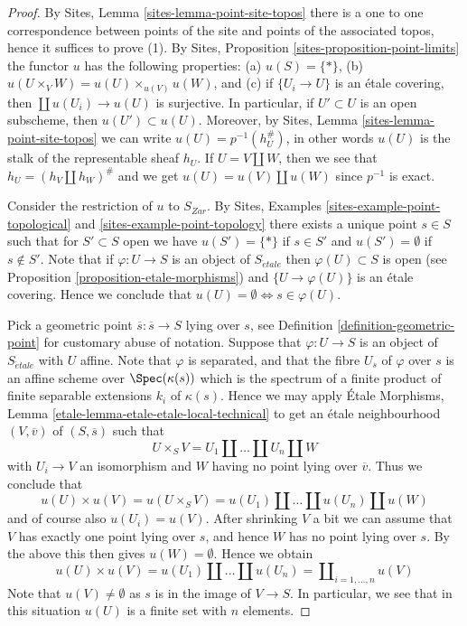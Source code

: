 \begin{proof}
By
Sites, Lemma \ref{sites-lemma-point-site-topos}
there is a one to one correspondence between points of the site and points
of the associated topos, hence it suffices to prove (1).
By
Sites, Proposition \ref{sites-proposition-point-limits}
the functor $u$ has the following properties:
(a) $u(S) = \{*\}$, (b) $u(U \times_V W) = u(U) \times_{u(V)} u(W)$, and
(c) if $\{U_i \to U\}$ is an \'etale covering, then
$\coprod u(U_i) \to u(U)$ is surjective.
In particular, if $U' \subset U$ is an open subscheme,
then $u(U') \subset u(U)$. Moreover, by
Sites, Lemma \ref{sites-lemma-point-site-topos}
we can write $u(U) = p^{-1}(h_U^\#)$, in other words $u(U)$ is the
stalk of the representable sheaf $h_U$. If
$U = V \amalg W$, then we see that $h_U = (h_V \amalg h_W)^\#$ and we get
$u(U) = u(V) \amalg u(W)$ since $p^{-1}$ is exact.

\medskip\noindent
Consider the restriction of $u$ to $S_{Zar}$. By
Sites, Examples \ref{sites-example-point-topological} and
\ref{sites-example-point-topology}
there exists a unique point $s \in S$ such that for $S' \subset S$ open we
have $u(S') = \{*\}$ if $s \in S'$ and $u(S') = \emptyset$ if $s \not \in S'$.
Note that if $\varphi : U \to S$ is an object of $S_{\acute{e}tale}$ then
$\varphi(U) \subset S$ is open (see
Proposition \ref{proposition-etale-morphisms})
and $\{U \to \varphi(U)\}$ is an \'etale covering. Hence we conclude that
$u(U) = \emptyset \Leftrightarrow s \in \varphi(U)$.

\medskip\noindent
Pick a geometric point $\overline{s} : \overline{s} \to S$ lying over $s$, see
Definition \ref{definition-geometric-point}
for customary abuse of notation. Suppose that $\varphi : U \to S$ is an object
of $S_{\acute{e}tale}$ with $U$ affine. Note that $\varphi$ is separated, and
that the fibre $U_s$ of $\varphi$ over $s$ is an affine scheme over
$\Spec(\kappa(s))$ which is the spectrum of a finite product of
finite separable extensions $k_i$ of $\kappa(s)$. Hence we may apply
\'Etale Morphisms, Lemma \ref{etale-lemma-etale-etale-local-technical}
to get an \'etale neighbourhood $(V, \overline{v})$ of $(S, \overline{s})$
such that
$$
U \times_S V = U_1 \amalg \ldots \amalg U_n \amalg W
$$
with $U_i \to V$ an isomorphism and $W$ having no point lying over
$\overline{v}$. Thus we conclude that
$$
u(U) \times u(V) =
u(U \times_S V) =
u(U_1) \amalg \ldots \amalg u(U_n) \amalg u(W)
$$
and of course also $u(U_i) = u(V)$. After shrinking $V$ a bit we can
assume that $V$ has exactly one point lying over $s$, and hence $W$ has no
point lying over $s$. By the above this then gives $u(W) = \emptyset$.
Hence we obtain
$$
u(U) \times u(V) =
u(U_1) \amalg \ldots \amalg u(U_n) =
\coprod\nolimits_{i = 1, \ldots, n} u(V)
$$
Note that $u(V) \not = \emptyset$ as $s$ is in the image of $V \to S$.
In particular, we see that in this situation $u(U)$ is a finite
set with $n$ elements.


\end{proof}
